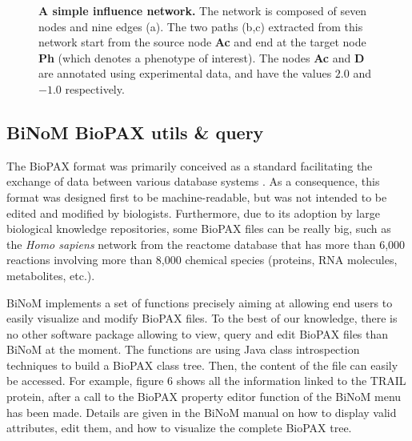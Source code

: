 \documentclass[10pt]{bmc_article}
\newenvironment{bmcformat}{\baselineskip20pt\sloppy\setboolean{publ}{false}}{\baselineskip20pt\sloppy}
\begin{document}
\begin{bmcformat}
\begin{figure}[h]
 \caption{\label{piquantnetworks}  \textbf{A simple influence network.} The
network is composed of seven nodes and nine edges (a). The two paths (b,c)
extracted from this network start from the source node \textbf{Ac} and end at
the target node \textbf{Ph} (which denotes a phenotype of interest). The nodes
\textbf{Ac} and \textbf{D} are annotated using experimental data, and have the
values $2.0$ and $-1.0$ respectively.}
\end{figure}

\subsection*{BiNoM BioPAX utils \& query}
The BioPAX format was primarily conceived as a standard facilitating the
exchange of data between various database systems \cite{demir2010biopax}. As a
consequence, this format was designed first to be machine-readable, but was not
intended
to be edited and modified by biologists. Furthermore, due to its adoption by
large biological knowledge repositories, some BioPAX files can be really big,
such as the \textit{Homo sapiens} network from the reactome database
\cite{joshi2005reactome} that has more than 6,000 reactions involving more than
8,000 chemical species (proteins, RNA molecules, metabolites, etc.).

BiNoM implements a set of functions precisely aiming at allowing end users to
easily visualize and modify BioPAX files. To the best of our knowledge, there is
no other software package allowing to view, query and edit BioPAX files than
BiNoM at the moment. The functions are using
Java class introspection techniques to build a BioPAX class tree. Then, the
content of the file can easily be accessed. For example, figure 6 shows
all the information linked to the TRAIL protein, after a call to the
BioPAX property
editor function of the BiNoM menu has been made. Details are given in the BiNoM manual on how
to display valid attributes, edit them, and how to visualize the
complete BioPAX tree.


\end{bmcformat}
\end{document}
